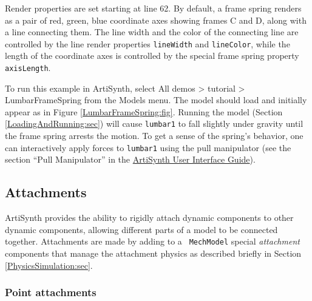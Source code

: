 Render properties are set starting at line 62. By default, a frame
spring renders as a pair of red, green, blue coordinate axes showing
frames C and D, along with a line connecting them. The line width and
the color of the connecting line are controlled by the line render
properties {\tt lineWidth} and {\tt lineColor}, while the length of
the coordinate axes is controlled by the special frame spring property
{\tt axisLength}.

To run this example in ArtiSynth, select {\sf All demos > tutorial >
LumbarFrameSpring} from the {\sf Models} menu. The model should load
and initially appear as in Figure \ref{LumbarFrameSpring:fig}.
Running the model (Section \ref{LoadingAndRunning:sec}) will cause
{\tt lumbar1} to fall slightly under gravity until the frame spring
arrests the motion. To get a sense of the spring's behavior, one can
interactively apply forces to {\tt lumbar1} using the pull manipulator
(see the section ``Pull Manipulator'' in the
\href{../uiguide/uiguide.html}{
ArtiSynth User Interface Guide}).

\subsection{Attachments}
\label{Attachments:sec}

ArtiSynth provides the ability to rigidly attach dynamic components to
other dynamic components, allowing different parts of a model to be
connected together.  Attachments are made by adding to a {\tt
MechModel} special {\it attachment} components that manage the
attachment physics as described briefly in Section
\ref{PhysicsSimulation:sec}.

\subsubsection{Point attachments}
\label{sec:mech:pointattachments}

